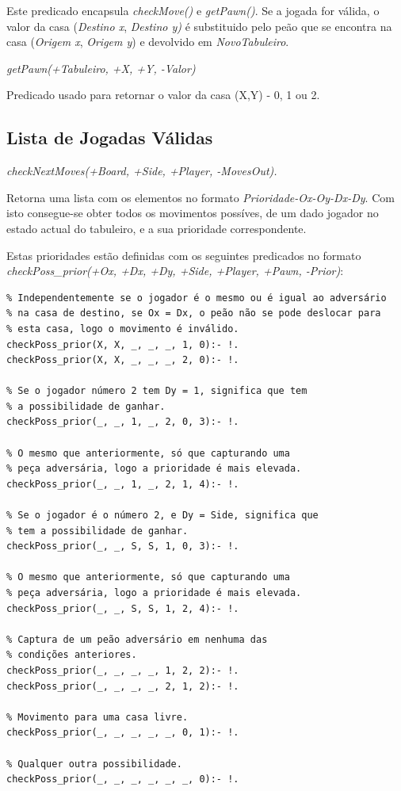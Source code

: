 \documentclass[15pt,a4paper]{article}
\begin{document}
Este predicado encapsula \textit{checkMove()} e \textit{getPawn()}.
Se a jogada for válida, o valor da casa (\textit{Destino x}, \textit{Destino y)} é substituido pelo
peão que se encontra na casa (\textit{Origem x}, \textit{Origem y}) e devolvido em \textit{NovoTabuleiro}.

\textit{getPawn(+Tabuleiro, +X, +Y, -Valor)}

Predicado usado para retornar o valor da casa (X,Y) - 0, 1 ou 2.


\subsection{Lista de Jogadas Válidas}

\textit{checkNextMoves(+Board, +Side, +Player, -MovesOut).}

Retorna uma lista com os elementos no formato \textit{Prioridade-Ox-Oy-Dx-Dy}.
Com isto consegue-se obter todos os movimentos possíves, de um dado jogador no estado actual do tabuleiro, e a sua prioridade correspondente.

Estas prioridades estão definidas com os seguintes predicados no formato
\textit{checkPoss\_prior(+Ox, +Dx, +Dy, +Side, +Player, +Pawn, -Prior)}:

\newpage

\begin{lstlisting}
% Independentemente se o jogador é o mesmo ou é igual ao adversário
% na casa de destino, se Ox = Dx, o peão não se pode deslocar para
% esta casa, logo o movimento é inválido.
checkPoss_prior(X, X, _, _, _, 1, 0):- !.
checkPoss_prior(X, X, _, _, _, 2, 0):- !.

% Se o jogador número 2 tem Dy = 1, significa que tem
% a possibilidade de ganhar.
checkPoss_prior(_, _, 1, _, 2, 0, 3):- !.

% O mesmo que anteriormente, só que capturando uma
% peça adversária, logo a prioridade é mais elevada.
checkPoss_prior(_, _, 1, _, 2, 1, 4):- !.

% Se o jogador é o número 2, e Dy = Side, significa que
% tem a possibilidade de ganhar.
checkPoss_prior(_, _, S, S, 1, 0, 3):- !.

% O mesmo que anteriormente, só que capturando uma
% peça adversária, logo a prioridade é mais elevada.
checkPoss_prior(_, _, S, S, 1, 2, 4):- !.

% Captura de um peão adversário em nenhuma das
% condições anteriores.
checkPoss_prior(_, _, _, _, 1, 2, 2):- !.
checkPoss_prior(_, _, _, _, 2, 1, 2):- !.

% Movimento para uma casa livre.
checkPoss_prior(_, _, _, _, _, 0, 1):- !.

% Qualquer outra possibilidade.
checkPoss_prior(_, _, _, _, _, _, 0):- !.
\end{lstlisting}
\end{document}
